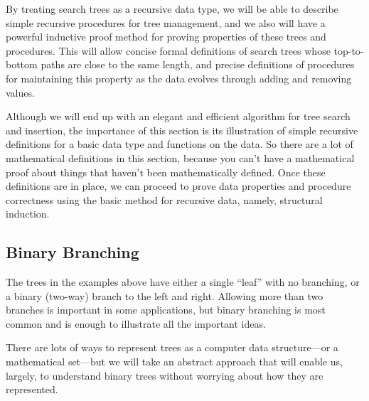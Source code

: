 \begin{definition}
\begin{figure}
\label{unbalanced}

\end{figure}

By treating search trees as a recursive data type, we will be able to
describe simple recursive procedures for tree management, and we also
will have a powerful inductive proof method for proving properties of
these trees and procedures.  This will allow concise formal
definitions of search trees whose top-to-bottom paths are close to the
same length, and precise definitions of procedures for maintaining this
property as the data evolves through adding and removing values.

Although we will end up with an elegant and efficient algorithm for
tree search and insertion, the importance of this section is its
illustration of simple recursive definitions for a basic data type and
functions on the data.  So there are a lot of mathematical definitions
in this section, because you can't have a mathematical proof about
things that haven't been mathematically defined.  Once these
definitions are in place, we can proceed to prove data properties and
procedure correctness using the basic method for recursive data,
namely, structural induction.

\subsection{Binary Branching}

The trees in the examples above have either a single ``leaf'' with no
branching, or a binary (two-way) branch to the left and right.
Allowing more than two branches is important in some applications, but
binary branching is most common and is enough to illustrate all the
important ideas.

There are lots of ways to represent trees as a computer data
structure---or a mathematical set---but we will take an abstract
approach that will enable us, largely, to understand binary trees
without worrying about how they are represented.


\end{definition}

